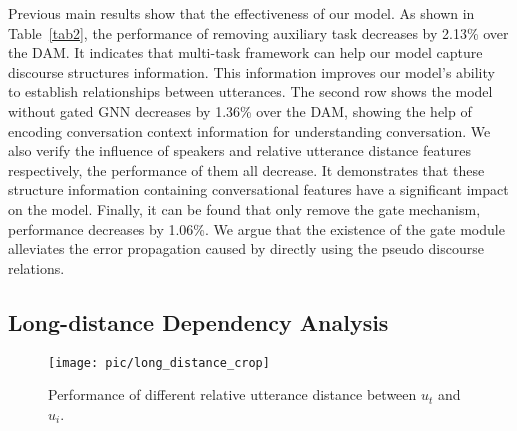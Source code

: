 \documentclass[11pt]{article}
\begin{document}
\begin{table}
    \centering
    \caption{\label{tab2}Ablation results. ``W/O'' represents ``without"}
\end{table}
Previous main results show that the effectiveness of our model.
As shown in Table~\ref{tab2}, the performance of removing auxiliary task decreases by 2.13\% over the DAM.
It indicates that multi-task framework can help our model capture discourse structures information.
This information improves our model's ability to establish relationships between utterances.
The second row shows the model without gated GNN decreases by 1.36\% over the DAM, showing the help of encoding conversation context information for understanding conversation.
We also verify the influence of speakers and relative utterance distance features respectively, the performance of them all decrease.
It demonstrates that these structure information containing conversational features have a significant impact on the model. 
Finally, it can be found that only remove the gate mechanism, performance decreases by 1.06\%.
We argue that the existence of the gate module alleviates the error propagation caused by directly using the pseudo discourse relations.

\subsection{Long-distance Dependency Analysis}

\begin{figure}[t]
    \centering
\texttt{[image: pic/long\_distance\_crop]}
    \caption{Performance of different relative utterance distance between $u_t$ and $u_i$.} 
    \label{fig3}
\end{figure}
\end{document}
